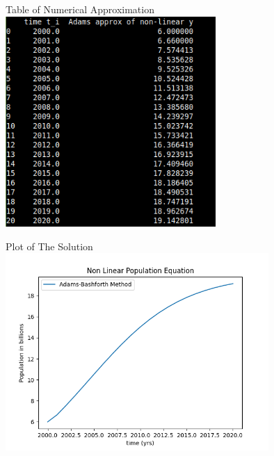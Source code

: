 \documentclass{beamer}
\begin{document}
\begin{frame}{Table of Numerical Approximation}
    \centering
        \includegraphics[width = 8cm] {table}
\end{frame}

\begin{frame}{Plot of The Solution}
    \centering
        \includegraphics[width = 10cm]{plot}
    \end{frame}
\end{document}
